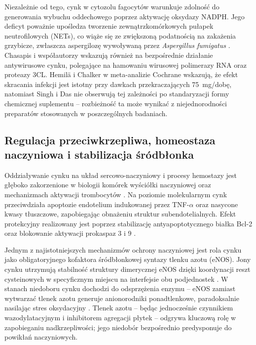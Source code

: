 \documentclass[12pt,a4paper]{article}
\begin{document}
Niezależnie od tego, cynk w cytozolu fagocytów warunkuje zdolność do generowania wybuchu oddechowego poprzez aktywację oksydazy NADPH. Jego deficyt poważnie upośledza tworzenie zewnątrzkomórkowych pułapek neutrofilowych (NETs), co wiąże się ze zwiększoną podatnością na zakażenia grzybicze, zwłaszcza aspergilozę wywoływaną przez \textit{Aspergillus fumigatus} \cite{wessels2017}. Chasapis i współautorzy \cite{chasapis2020} wskazują również na bezpośrednie działanie antywirusowe cynku, polegające na hamowaniu wirusowej polimerazy RNA oraz proteazy 3CL. Hemilä i Chalker w meta-analizie Cochrane wskazują, że efekt skracania infekcji jest istotny przy dawkach przekraczających 75~mg/dobę, natomiast Singh i Das nie obserwują tej zależności po standaryzacji formy chemicznej suplementu \cite{chasapis2020} -- rozbieżność ta może wynikać z niejednorodności preparatów stosowanych w poszczególnych badaniach.

\subsection{Regulacja przeciwkrzepliwa, homeostaza naczyniowa i stabilizacja śródbłonka}

Oddziaływanie cynku na układ sercowo-naczyniowy i procesy hemostazy jest głęboko zakorzenione w biologii komórek wyściółki naczyniowej oraz mechanizmach aktywacji trombocytów \cite{tamura2021}. Na poziomie molekularnym cynk przeciwdziała apoptozie endotelium indukowanej przez TNF-$\alpha$ oraz nasycone kwasy tłuszczowe, zapobiegając obnażeniu struktur subendotelialnych. Efekt protekcyjny realizowany jest poprzez stabilizację antyapoptotycznego białka Bcl-2 oraz blokowanie aktywacji prokaspaz 3 i 9 \cite{tamura2021, costa2023}.

Jednym z najistotniejszych mechanizmów ochrony naczyniowej jest rola cynku jako obligatoryjnego kofaktora śródbłonkowej syntazy tlenku azotu (eNOS). Jony cynku utrzymują stabilność struktury dimerycznej eNOS dzięki koordynacji reszt cysteinowych w specyficznym miejscu na interfejsie obu podjednostek \cite{costa2023}. W stanach niedoboru cynku dochodzi do odsprzężenia enzymu -- eNOS zamiast wytwarzać tlenek azotu generuje anionorodniki ponadtlenkowe, paradoksalnie nasilając stres oksydacyjny \cite{costa2023}. Tlenek azotu -- będąc jednocześnie czynnikiem wazodylatacyjnym i inhibitorem agregacji płytek -- odgrywa kluczową rolę w zapobieganiu nadkrzepliwości; jego niedobór bezpośrednio predysponuje do powikłań naczyniowych.
\end{document}
